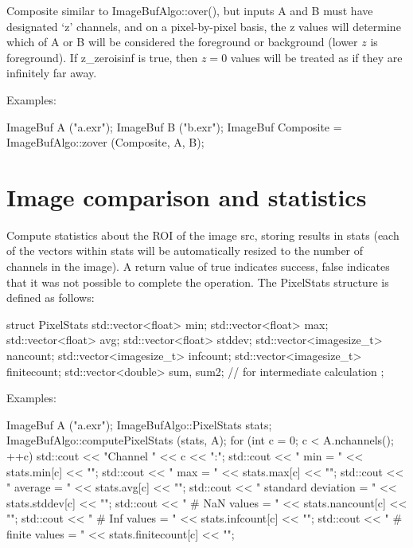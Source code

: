 Composite similar to {\cf ImageBufAlgo::over()}, but inputs {\cf A} and
{\cf B} must have designated `z' channels, and on a pixel-by-pixel basis,
the z values will determine which of A or B will be considered the
foreground or background (lower $z$ is foreground).  If {\cf z_zeroisinf} is
{\cf true}, then $z=0$ values will be treated as if they are infinitely far
away.

\smallskip
\noindent Examples:
\begin{code}
    ImageBuf A ("a.exr");
    ImageBuf B ("b.exr");
    ImageBuf Composite = ImageBufAlgo::zover (Composite, A, B);
\end{code}
\apiend


\section{Image comparison and statistics}
\label{sec:iba:stats}

 
\label{sec:iba:computePixelStats}

Compute statistics about the ROI of the image {\cf src}, storing results
in {\cf stats} (each of the vectors within {\cf stats} will be
automatically resized to the number of channels in the image).  A return
value of {\cf true} indicates success, {\cf false} indicates that it was
not possible to complete the operation.
 The {\cf PixelStats} structure is defined as follows:
\begin{code}
struct PixelStats {
    std::vector<float> min;
    std::vector<float> max;
    std::vector<float> avg;
    std::vector<float> stddev;
    std::vector<imagesize_t> nancount;
    std::vector<imagesize_t> infcount;
    std::vector<imagesize_t> finitecount;
    std::vector<double> sum, sum2;  // for intermediate calculation
};
\end{code}

\smallskip
\noindent Examples:
\begin{code}
    ImageBuf A ("a.exr");
    ImageBufAlgo::PixelStats stats;
    ImageBufAlgo::computePixelStats (stats, A);
    for (int c = 0;  c < A.nchannels();  ++c) {
        std::cout << "Channel " << c << ":\n";
        std::cout << "   min = " << stats.min[c] << "\n";
        std::cout << "   max = " << stats.max[c] << "\n";
        std::cout << "   average = " << stats.avg[c] << "\n";
        std::cout << "   standard deviation  = " << stats.stddev[c] << "\n";
        std::cout << "   # NaN values    = " << stats.nancount[c] << "\n";
        std::cout << "   # Inf values    = " << stats.infcount[c] << "\n";
        std::cout << "   # finite values = " << stats.finitecount[c] << "\n";
    }
\end{code}
\apiend

